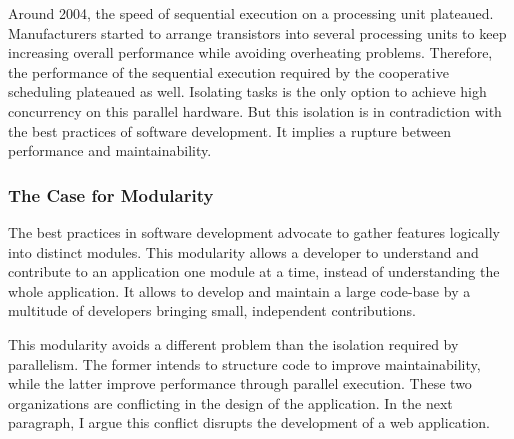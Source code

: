 
Around 2004, the speed of sequential execution on a processing unit plateaued.
Manufacturers started to arrange transistors into several processing units to keep increasing overall performance while avoiding overheating problems.
Therefore, the performance of the sequential execution required by the cooperative scheduling plateaued as well.
Isolating tasks is the only option to achieve high concurrency on this parallel hardware.
But this isolation is in contradiction with the best practices of software development.
It implies a rupture between performance and maintainability.

\subsubsection{The Case for Modularity}

The best practices in software development advocate to gather features logically into distinct modules.
This modularity allows a developer to understand and contribute to an application one module at a time, instead of understanding the whole application.
It allows to develop and maintain a large code-base by a multitude of developers bringing small, independent contributions.



This modularity avoids a different problem than the isolation required by parallelism.
The former intends to structure code to improve maintainability, while the latter improve performance through parallel execution.
These two organizations are conflicting in the design of the application.
In the next paragraph, I argue this conflict disrupts the development of a web application.

